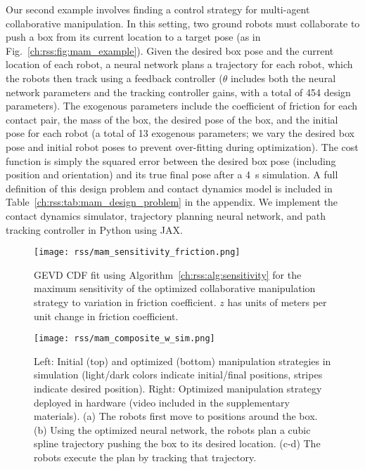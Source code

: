 Our second example involves finding a control strategy for multi-agent collaborative manipulation. In this setting, two ground robots must collaborate to push a box from its current location to a target pose (as in Fig.~\ref{ch:rss:fig:mam_example}). Given the desired box pose and the current location of each robot, a neural network plans a trajectory for each robot, which the robots then track using a feedback controller ($\theta$ includes both the neural network parameters and the tracking controller gains, with a total of 454 design parameters). The exogenous parameters include the coefficient of friction for each contact pair, the mass of the box, the desired pose of the box, and the initial pose for each robot (a total of 13 exogenous parameters; we vary the desired box pose and initial robot poses to prevent over-fitting during optimization). The cost function is simply the squared error between the desired box pose (including position and orientation) and its true final pose after a \SI{4}{s} simulation. A full definition of this design problem and contact dynamics model is included in Table~\ref{ch:rss:tab:mam_design_problem} in the appendix. We implement the contact dynamics simulator, trajectory planning neural network, and path tracking controller in Python using JAX.

\begin{figure}[t]
    \centering
    \texttt{[image: rss/mam\_sensitivity\_friction.png]}
    \caption{GEVD CDF fit using Algorithm~\ref{ch:rss:alg:sensitivity} for the maximum sensitivity of the optimized collaborative manipulation strategy to variation in friction coefficient. $z$ has units of meters per unit change in friction coefficient.}
    \label{ch:rss:fig:mam_gevd}
\end{figure}

\begin{figure*}[tb!]
    \centering
    \texttt{[image: rss/mam\_composite\_w\_sim.png]}
    \caption{Left: Initial (top) and optimized (bottom) manipulation strategies in simulation (light/dark colors indicate initial/final positions, stripes indicate desired position). Right: Optimized manipulation strategy deployed in hardware (video included in the supplementary materials). (a) The robots first move to positions around the box. (b) Using the optimized neural network, the robots plan a cubic spline trajectory pushing the box to its desired location. (c-d) The robots execute the plan by tracking that trajectory.}
    \label{ch:rss:fig:mam_hw}
\end{figure*}

